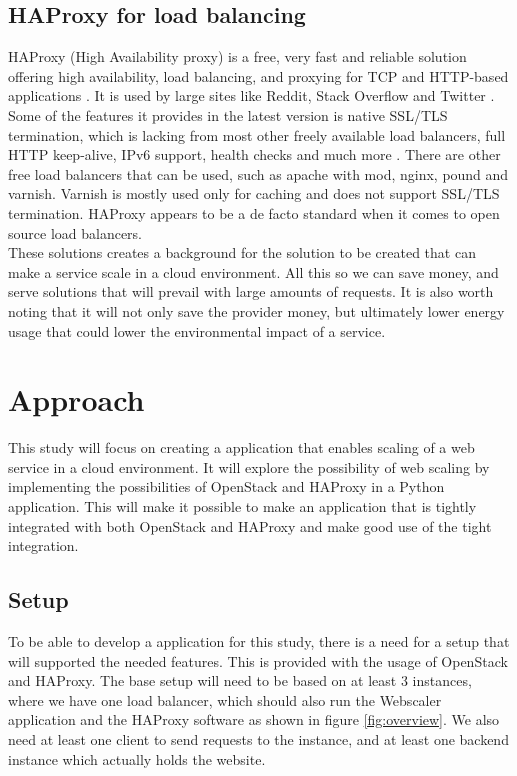 \subsection{HAProxy for load balancing}
HAProxy (High Availability proxy) is a free, very fast and reliable solution offering
high availability, load balancing, and proxying for TCP and HTTP-based applications
\cite{haproxy:2014}. It is used by large sites like Reddit, Stack Overflow and
Twitter \cite{haproxy:they_use_it}. Some of the features it provides in the
latest version is native SSL/TLS termination, which is lacking from most other
freely available load balancers, full HTTP keep-alive, IPv6 support, health
checks and much more \cite{haproxy:2014}. There are other free load balancers
that can be used, such as apache with mod, nginx, pound and varnish. Varnish is
mostly used only for caching and does not support SSL/TLS termination. HAProxy
appears to be a de facto standard when it comes to open source load
balancers.\\

These solutions creates a background for the solution to be created that can
make a service scale in a cloud environment. All this so we can save money, and
serve solutions that will prevail with large amounts of requests.
It is also worth noting that it will not only save the provider money, but
ultimately lower energy usage that could lower the environmental impact of a
service.


\section{Approach}
This study will focus on creating a application that enables scaling of a web 
service in a cloud environment. It will explore the possibility of web scaling
by implementing the possibilities of OpenStack and HAProxy in a Python
application. 
This will make it possible to make an application that is tightly integrated
with both OpenStack and HAProxy and make good use of the tight integration.

\subsection{Setup}
To be able to develop a application for this study, there is a need for a setup
that will supported the needed features. This is provided with the usage of
OpenStack and HAProxy. The base setup will need to be based on at least 3
instances, where we have one load balancer, which should also run the Webscaler
application and the HAProxy software as shown in figure \ref{fig:overview}. We
also need at least one client to send requests to the instance, and at least
one backend instance which actually holds the website.

